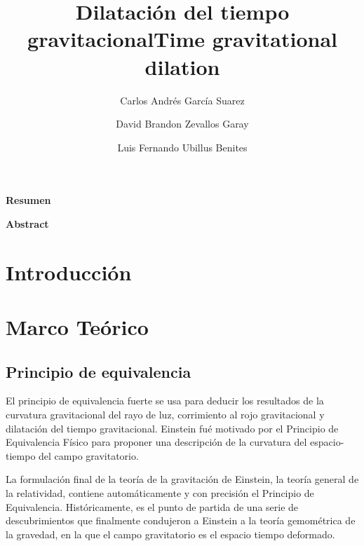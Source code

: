 \documentclass[12pt,twoside]{rif}
\title{\textbf{Dilatación del tiempo gravitacional}}
\author[1]{{\small Carlos Andrés García Suarez}}
\author[1]{{\small David Brandon Zevallos Garay}}
\author[1]{{\small Luis Fernando Ubillus Benites}}
\affil[1]{{ \small Facultad de Ciencias Naturales y Matemática, Universidad
		Nacional Federico Villarreal. El Agustino 15003. Lima-Perú.}}
\date{}
\begin{document}
	\maketitle
	
	\begin{res}
		\begin{center}
			\textbf{Resumen} \\
		\end{center}
		\lipsum[2]
		
		\par
		\smallskip
	\end{res}
	\begin{center}
		\title{\textbf{Time gravitational dilation}}
	\end{center}
	
	\begin{abst}
		\begin{center}
			\textbf{Abstract} \\
		\end{center}
		\lipsum[2]
		
		\par 
		\smallskip
	\end{abst}

	
	
	\newpage
	
	\tableofcontents
	
	\section{ Introducción} 
	
	\section{Marco Teórico}
		\subsection{Principio de equivalencia}
		El principio de equivalencia fuerte se usa para deducir los resultados de la curvatura gravitacional del rayo de luz, corrimiento al rojo gravitacional y dilatación del tiempo gravitacional. Einstein fué motivado por el Principio de Equivalencia Físico para proponer una descripción de la curvatura del espacio-tiempo del campo gravitatorio. \citep*{TaPeuCheng2005}

		La formulación final de la teoría de la gravitación de Einstein, la teoría general de la relatividad, contiene automáticamente y con precisión el Principio de Equivalencia. Históricamente, es el punto de partida de una serie de descubrimientos que finalmente condujeron a Einstein a la teoría gemométrica de la gravedad, en la que el campo gravitatorio es el espacio tiempo deformado.
\end{document}
